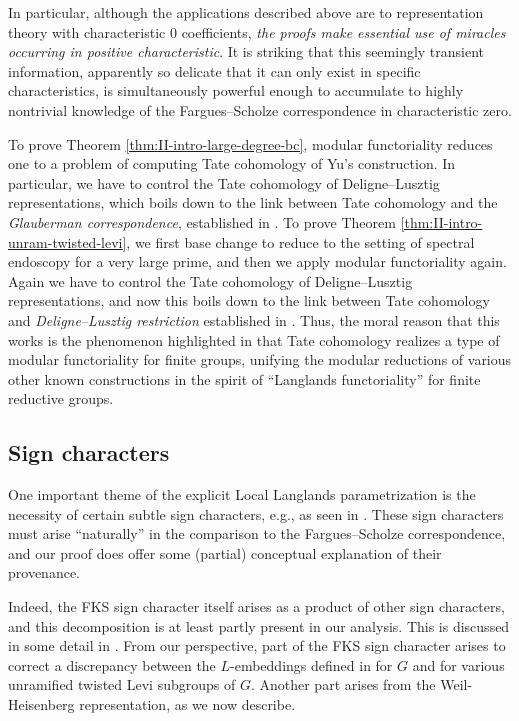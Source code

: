 \documentclass[reqno]{amsart}
\numberwithin{equation}{subsection}
\theoremstyle{remark}
\numberwithin{equation}{subsection}
\numberwithin{figure}{subsection}
\begin{document}
In particular, although the applications described above are to representation theory with characteristic $0$ coefficients, \emph{the proofs make essential use of miracles occurring in positive characteristic}. It is striking that this seemingly transient information, apparently so delicate that it can only exist in specific characteristics, is simultaneously powerful enough to accumulate to highly nontrivial knowledge of the Fargues--Scholze correspondence in characteristic zero. 

To prove Theorem \ref{thm:II-intro-large-degree-bc}, modular functoriality reduces one to a problem of computing Tate cohomology of Yu's construction. In particular, we have to control the Tate cohomology of Deligne--Lusztig representations, which boils down to the link between Tate cohomology and the \emph{Glauberman correspondence}, established in \cite[Corollary~3.5.5, Lemma~3.5.11]{Cot26b}. To prove Theorem \ref{thm:II-intro-unram-twisted-levi}, we first base change to reduce to the setting of spectral endoscopy for a very large prime, and then we apply modular functoriality again. Again we have to control the Tate cohomology of Deligne--Lusztig representations, and now this boils down to the link between Tate cohomology and \emph{Deligne--Lusztig restriction} established in \cite[Proposition~3.4.1]{Cot26b}. Thus, the moral reason that this works is the phenomenon highlighted in \cite{Cot26b} that Tate cohomology realizes a type of modular functoriality for finite groups, unifying the modular reductions of various other known constructions in the spirit of ``Langlands functoriality'' for finite reductive groups.


\subsection{Sign characters}\label{ss:III-signs} One important theme of the explicit Local Langlands parametrization is the necessity of certain subtle sign characters, e.g., as seen in \cite{FKS23}. These sign characters must arise ``naturally'' in the comparison to the Fargues--Scholze correspondence, and our proof does offer some (partial) conceptual explanation of their provenance. 

Indeed, the FKS sign character itself arises as a product of other sign characters, and this decomposition is at least partly present in our analysis. This is discussed in some detail in \cite[\S 1.5]{CF26a}. From our perspective, part of the FKS sign character arises to correct a discrepancy between the $L$-embeddings defined in \cite[\S 4.2]{FKS23} for $G$ and for various unramified twisted Levi subgroups of $G$. Another part arises from the Weil-Heisenberg representation, as we now describe.
\end{document}
